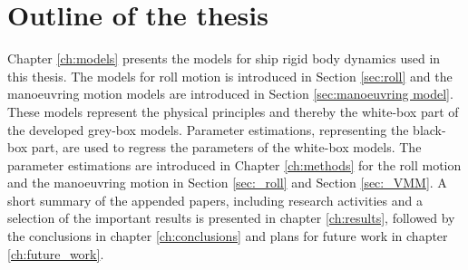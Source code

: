 \section{Outline of the thesis}
Chapter \ref{ch:models} presents the models for ship rigid body dynamics used in this thesis. The models for roll motion is introduced in Section \ref{sec:roll} and the manoeuvring motion models are introduced in Section \ref{sec:manoeuvring model}. These models represent the physical principles and thereby the white-box part of the developed grey-box models.
Parameter estimations, representing the black-box part, are used to regress the parameters of the white-box models. The parameter estimations are introduced in Chapter \ref{ch:methods} for the roll motion and the manoeuvring motion in Section \ref{sec:_roll} and Section \ref{sec:_VMM}. 
A short summary of the appended papers, including research activities and a selection of the important results is presented in chapter \ref{ch:results}, followed by the conclusions in chapter \ref{ch:conclusions} and plans for future work in chapter \ref{ch:future_work}.